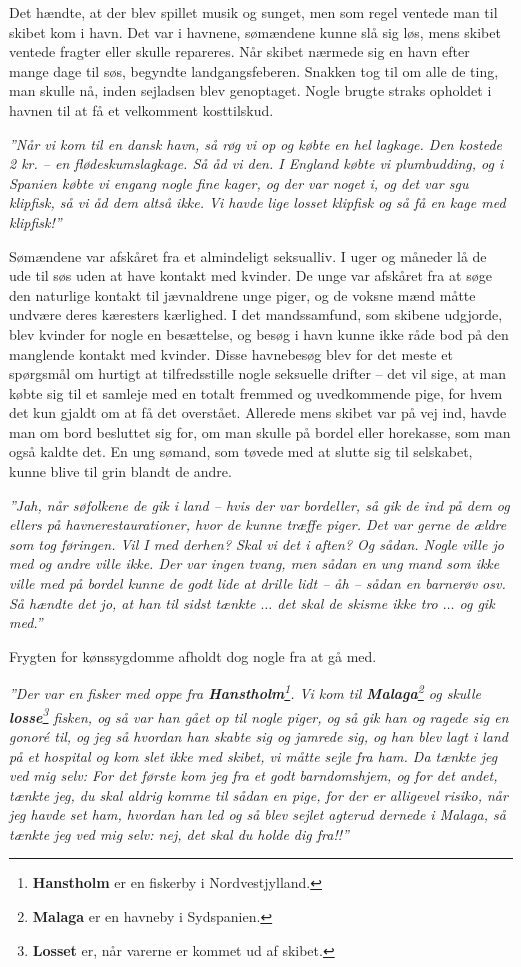 Det hændte, at der blev spillet musik og sunget, men som regel ventede
man til skibet kom i havn. Det var i havnene, sømændene kunne slå sig
løs, mens skibet ventede fragter eller skulle repareres. Når skibet
nærmede sig en havn efter mange dage til søs, begyndte landgangsfeberen.
Snakken tog til om alle de ting, man skulle nå, inden sejladsen blev
genoptaget. Nogle brugte straks opholdet i havnen til at få et
velkomment kosttilskud.

\emph{''Når vi kom til en dansk havn, så røg vi op og købte en hel
lagkage. Den kostede 2 kr. -- en flødeskumslagkage. Så åd vi den. I
England købte vi plumbudding, og i Spanien købte vi engang nogle fine
kager, og der var noget i, og det var sgu klipfisk, så vi åd dem altså
ikke. Vi havde lige losset klipfisk og så få en kage med klipfisk!''}

Sømændene var afskåret fra et almindeligt seksualliv. I uger og måneder
lå de ude til søs uden at have kontakt med kvinder. De unge var afskåret
fra at søge den naturlige kontakt til jævnaldrene unge piger, og de
voksne mænd måtte undvære deres kæresters kærlighed. I det mandssamfund,
som skibene udgjorde, blev kvinder for nogle en besættelse, og besøg i
havn kunne ikke råde bod på den manglende kontakt med kvinder. Disse
havnebesøg blev for det meste et spørgsmål om hurtigt at tilfredsstille
nogle seksuelle drifter -- det vil sige, at man købte sig til et samleje
med en totalt fremmed og uvedkommende pige, for hvem det kun gjaldt om
at få det overstået. Allerede mens skibet var på vej ind, havde man om
bord besluttet sig for, om man skulle på bordel eller horekasse, som man
også kaldte det. En ung sømand, som tøvede med at slutte sig til
selskabet, kunne blive til grin blandt de andre.

\emph{''Jah, når søfolkene de gik i land -- hvis der var bordeller, så
gik de ind på dem og ellers på havnerestaurationer, hvor de kunne træffe
piger. Det var gerne de ældre som tog føringen. Vil I med derhen? Skal
vi det i aften? Og sådan. Nogle ville jo med og andre ville ikke. Der
var ingen tvang, men sådan en ung mand som ikke ville med på bordel
kunne de godt lide at drille lidt -- åh -- sådan en barnerøv osv. Så
hændte det jo, at han til sidst tænkte \(\ldots\) det skal de skisme
ikke tro \(\ldots\) og gik med.''}

Frygten for kønssygdomme afholdt dog nogle fra at gå med.

\emph{''Der var en fisker med oppe fra \textbf{Hanstholm}\footnote{\textbf{Hanstholm}
  er en fiskerby i Nordvestjylland.}. Vi kom til
\textbf{Malaga}\footnote{\textbf{Malaga} er en havneby i Sydspanien.} og
skulle \textbf{losse}\footnote{\textbf{Losset} er, når varerne er kommet
  ud af skibet.} fisken, og så var han gået op til nogle piger, og så
gik han og ragede sig en gonoré til, og jeg så hvordan han skabte sig og
jamrede sig, og han blev lagt i land på et hospital og kom slet ikke med
skibet, vi måtte sejle fra ham. Da tænkte jeg ved mig selv: For det
første kom jeg fra et godt barndomshjem, og for det andet, tænkte jeg,
du skal aldrig komme til sådan en pige, for der er alligevel risiko, når
jeg havde set ham, hvordan han led og så blev sejlet agterud dernede i
Malaga, så tænkte jeg ved mig selv: nej, det skal du holde dig fra!!'' }

